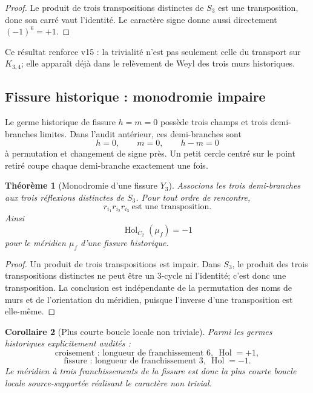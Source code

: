 \documentclass[11pt,a4paper]{article}
\newtheorem{theorem}{Théorème}[section]
\newtheorem{corollary}[theorem]{Corollaire}
\begin{document}
\begin{proof}
Le produit de trois transpositions distinctes de $S_3$ est une transposition, donc son carré vaut l'identité. Le caractère signe donne aussi directement $(-1)^6=+1$.
\end{proof}

Ce résultat renforce v15 : la trivialité n'est pas seulement celle du transport sur $K_{3,4}$; elle apparaît déjà dans le relèvement de Weyl des trois murs historiques.

\subsection{Fissure historique : monodromie impaire}

Le germe historique de fissure $h=m=0$ possède trois champs et trois demi-branches limites. Dans l'audit antérieur, ces demi-branches sont
\[
 h=0,\qquad m=0,\qquad h-m=0
\]
à permutation et changement de signe près. Un petit cercle centré sur le point retiré coupe chaque demi-branche exactement une fois.

\begin{theorem}[Monodromie d'une fissure $Y_3$]\label{thm:v16-fissure-monodromy}
Associons les trois demi-branches aux trois réflexions distinctes de $S_3$. Pour tout ordre de rencontre,
\begin{equation}\label{eq:v16-fissure-product}
 \boxed{
 r_{i_1}r_{i_2}r_{i_3}
 \ \text{est une transposition}.}
\end{equation}
Ainsi
\begin{equation}\label{eq:v16-fissure-holonomy}
 \boxed{
 \operatorname{Hol}_{C_2}(\mu_f)=-1}
\end{equation}
pour le méridien $\mu_f$ d'une fissure historique.
\end{theorem}

\begin{proof}
Un produit de trois transpositions est impair. Dans $S_3$, le produit des trois transpositions distinctes ne peut être un $3$-cycle ni l'identité; c'est donc une transposition. La conclusion est indépendante de la permutation des noms de murs et de l'orientation du méridien, puisque l'inverse d'une transposition est elle-même.
\end{proof}

\begin{corollary}[Plus courte boucle locale non triviale]\label{cor:v16-shortest-loop}
Parmi les germes historiques explicitement audités :
\[
 \boxed{
 \text{croisement : longueur de franchissement }6,\ \operatorname{Hol}=+1,}
\]
\[
 \boxed{
 \text{fissure : longueur de franchissement }3,\ \operatorname{Hol}=-1.}
\]
Le méridien à trois franchissements de la fissure est donc la plus courte boucle locale source-supportée réalisant le caractère non trivial.
\end{corollary}
\end{document}
